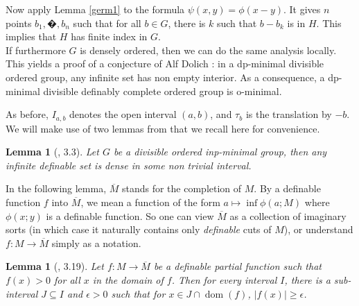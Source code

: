 \documentclass[english]{article}
\newtheorem{lemme}[thm]{Lemma}
\theoremstyle{definition}
\theoremstyle{mystyle}
\theoremstyle{remark}
\DeclareMathOperator{\dom}{dom}
\begin{document}
Now apply Lemma \ref{germ1} to the formula $\psi(x,y) = \phi(x-y)$. It gives $n$ points $b_1,�,b_n$ such that for all $b \in G$, there is $k$ such that $b-b_k$ is in $H$. This implies that $H$ has finite index in $G$.
\\

If furthermore $G$ is densely ordered, then we can do the same analysis locally. This yields a proof of a conjecture of Alf Dolich : in a dp-minimal divisible ordered group, any infinite set has non empty interior. As a consequence, a dp-minimal divisible definably complete ordered group is o-minimal.

As before, $I_{a,b}$ denotes the open interval $(a,b)$, and $\tau_b$ is the translation by $-b$. We will make use of two lemmas from \cite{Good} that we recall here for convenience.
\begin{lemme}[\cite{Good}, 3.3]\label{dense}
Let $G$ be a divisible ordered inp-minimal group, then any infinite definable set is dense in some non trivial interval.
\end{lemme}

In the following lemma, $\overline M$ stands for the completion of $M$. By a definable function $f$ into $\overline M$, we mean a function of the form $a \mapsto \inf \phi(a;M)$ where $\phi(x;y)$ is a definable function. So one can view $\overline M$ as a collection of imaginary sorts (in which case it naturally contains only \emph{definable} cuts of $M$), or understand $f : M \rightarrow \overline M$ simply as a notation.

\begin{lemme}[\cite{Good}, 3.19]\label{bdd}
Let $f : M \rightarrow \overline M$ be a definable partial function such that $f(x)>0$ for all $x$ in the domain of $f$. Then for every interval $I$, there is a sub-interval $J \subseteq I$ and $\epsilon >0$ such that for $x\in J \cap \dom(f)$, $|f(x)|\geq \epsilon$.
\end{lemme}
\end{document}
